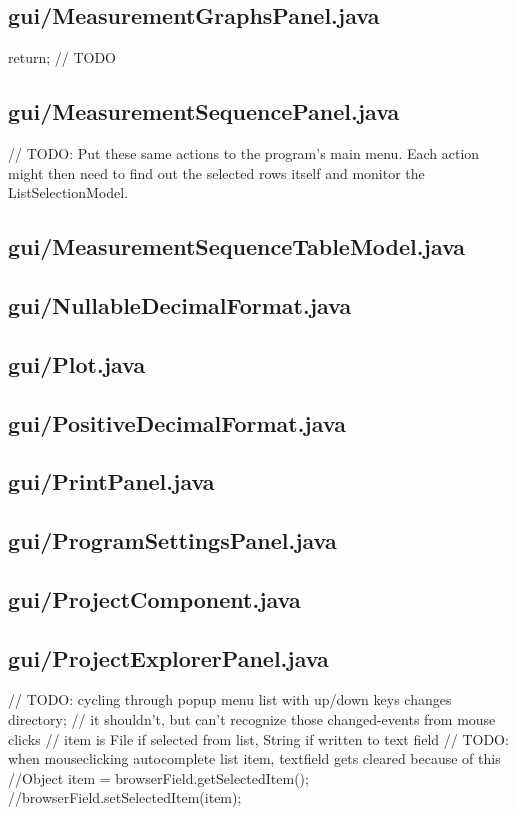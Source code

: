 \subsection{gui/MeasurementGraphsPanel.java}
        return; // TODO

\subsection{gui/MeasurementSequencePanel.java}
        // TODO: Put these same actions to the program's main menu. Each action might then need to find out the selected rows itself and monitor the ListSelectionModel.

\subsection{gui/MeasurementSequenceTableModel.java}

\subsection{gui/NullableDecimalFormat.java}

\subsection{gui/Plot.java}

\subsection{gui/PositiveDecimalFormat.java}

\subsection{gui/PrintPanel.java}

\subsection{gui/ProgramSettingsPanel.java}

\subsection{gui/ProjectComponent.java}

\subsection{gui/ProjectExplorerPanel.java}
                // TODO: cycling through popup menu list with up/down keys changes directory;
                // it shouldn't, but can't recognize those changed-events from mouse clicks
                // item is File if selected from list, String if written to text field
                    // TODO: when mouseclicking autocomplete list item, textfield gets cleared because of this
                    //Object item = browserField.getSelectedItem();
                    //browserField.setSelectedItem(item);

